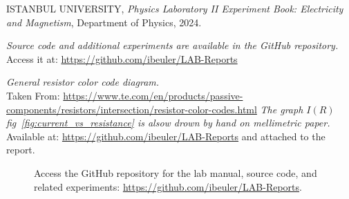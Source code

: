 \documentclass[journal]{IEEEtran}
\begin{document}
\begin{thebibliography}{9}

    ISTANBUL UNIVERSITY, 
    \textit{Physics Laboratory II Experiment Book: Electricity and Magnetism}, 
    Department of Physics, 2024.

    \textit{Source code and additional experiments are available in the GitHub repository.} \\ 
    Access it at: \url{https://github.com/ibeuler/LAB-Reports}

    \textit{General resistor color code diagram.}\\
    Taken From: \url{https://www.te.com/en/products/passive-components/resistors/intersection/resistor-color-codes.html}
    \textit{The graph $I(R)$ fig~\ref{fig:current_vs_resistance} is alsow drown by hand on mellimetric paper.}\\
    Available at: \url{https://github.com/ibeuler/LAB-Reports}
    and attached to the report.
\end{thebibliography}

\begin{figure}[H]
    \centering
    \begin{minipage}{0.15\textwidth}
        \centering
    \end{minipage}%
    \begin{minipage}{0.2\textwidth}
        \raggedright
        \caption{Access the GitHub repository for the lab manual, source code, and related experiments: \href{https://github.com/ibeuler/LAB-Reports}{\url{https://github.com/ibeuler/LAB-Reports}}.}
    \end{minipage}
    \label{fig:qr}
\end{figure}
\end{document}
